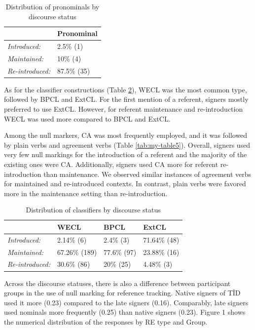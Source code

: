 \documentclass[]{elsarticle} %
\begin{document}
\begin{table}
\small
\caption{Distribution of pronominals by discourse status}
\label{tab:my-table3}
\begin{tabular}{ll}
\hline
                        & Pronominal  \\ \hline
\textit{Introduced:}    & 2.5\% (1)   \\
\textit{Maintained:}    & 10\% (4)    \\
\textit{Re-introduced:} & 87.5\% (35) \\ \hline
\end{tabular}
\end{table}

As for the classifier constructions (Table \ref{tab:my-table4}), WECL
was the most common type, followed by BPCL and ExtCL. For the first
mention of a referent, signers mostly preferred to use ExtCL. However,
for referent maintenance and re-introduction WECL was used more compared
to BPCL and ExtCL.

Among the null markers, CA was most frequently employed, and it was
followed by plain verbs and agreement verbs (Table \ref{tab:my-table5}).
Overall, signers used very few null markings for the introduction of a
referent and the majority of the existing ones were CA. Additionally,
signers used CA more for referent re-introduction than maintenance. We
observed similar instances of agreement verbs for maintained and
re-introduced contexts. In contrast, plain verbs were favored more in
the maintenance setting than re-introduction.

\begin{table}
\small
\caption{Distribution of classifiers by discourse status}
\label{tab:my-table4}
\begin{tabular}{llll}
\hline
                        & WECL          & BPCL        & ExtCL         \\ \hline
\textit{Introduced:}    & 2.14\% (6)    & 2.4\% (3)   & 71.64\% (48) \\
\textit{Maintained:}    & 67.26\% (189) & 77.6\% (97) & 23.88\% (16) \\
\textit{Re-introduced:} & 30.6\% (86)   & 20\% (25)   & 4.48\% (3)   \\ \hline
\end{tabular}
\end{table}

Across the discourse statuses, there is also a difference between
participant groups in the use of null marking for reference tracking.
Native signers of TİD used it more (0.23) compared to the late signers
(0.16). Comparably, late signers used nominals more frequently (0.25)
than native signers (0.23). Figure 1 shows the numerical distribution of
the responses by RE type and Group.
\end{document}
